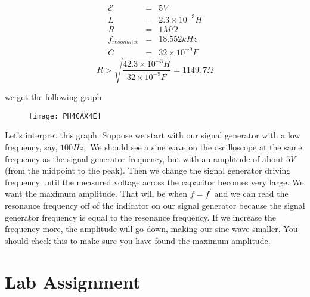 \begin{eqnarray*}
	\mathcal{E} &=&5\unit{V} \\
	          L &=&2.3\times 10^{-3}\unit{H} \\
			  R &=&1\unit{M\Omega} \\
  f_{resonance} &=&18.552\unit{kHz} \\
              C &=&32\times 10^{-9}\unit{F}
\end{eqnarray*}
\begin{equation*}
	R>\sqrt{\frac{42.3\times 10^{-3}\unit{H}}{32\times 10^{-9}\unit{F}}}=1149.\,\allowbreak 7\unit{\Omega}
\end{equation*}

\noindent we get the following graph

\begin{figure}[h!]
	\centering
	\texttt{[image: PH4CAX4E]}
\end{figure}

Let's interpret this graph. Suppose we start with our signal generator with a low frequency, say, $100\unit{Hz},$ We should see a sine wave on the oscilloscope at the same frequency as the signal generator frequency, but with an amplitude of about $5\unit{V}$ (from the midpoint to the peak). Then we change the signal generator driving frequency until the measured voltage across the capacitor becomes very large. We want the maximum amplitude. That will be when $f=f^{\prime }$ and we can read the resonance frequency off of the indicator on our signal generator because the signal generator frequency is equal to the resonance frequency. If we increase the frequency more, the amplitude will go down, making our sine wave smaller. You should check this to make sure you have found the maximum amplitude.

\section{Lab Assignment}

